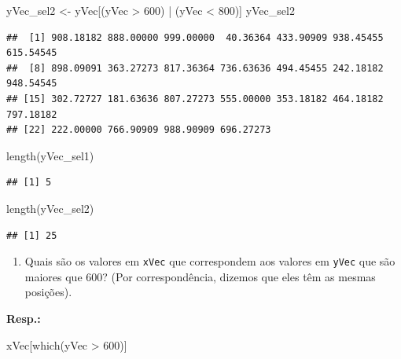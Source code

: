 \documentclass[
]{article}
\newenvironment{Shaded}{\begin{snugshade}}{\end{snugshade}}
\newcommand{\DecValTok}[1]{\textcolor[rgb]{0.00,0.00,0.81}{#1}}
\newcommand{\FunctionTok}[1]{\textcolor[rgb]{0.00,0.00,0.00}{#1}}
\newcommand{\NormalTok}[1]{#1}
\newcommand{\OtherTok}[1]{\textcolor[rgb]{0.56,0.35,0.01}{#1}}
\newcommand{\SpecialCharTok}[1]{\textcolor[rgb]{0.00,0.00,0.00}{#1}}
\providecommand{\tightlist}{%
  \setlength{\itemsep}{0pt}\setlength{\parskip}{0pt}}
\begin{document}
\begin{Shaded}
\begin{Highlighting}[]
\NormalTok{yVec\_sel2 }\OtherTok{\textless{}{-}}\NormalTok{ yVec[(yVec }\SpecialCharTok{\textgreater{}} \DecValTok{600}\NormalTok{) }\SpecialCharTok{|}\NormalTok{ (yVec }\SpecialCharTok{\textless{}} \DecValTok{800}\NormalTok{)]}
\NormalTok{yVec\_sel2}
\end{Highlighting}
\end{Shaded}

\begin{verbatim}
##  [1] 908.18182 888.00000 999.00000  40.36364 433.90909 938.45455 615.54545
##  [8] 898.09091 363.27273 817.36364 736.63636 494.45455 242.18182 948.54545
## [15] 302.72727 181.63636 807.27273 555.00000 353.18182 464.18182 797.18182
## [22] 222.00000 766.90909 988.90909 696.27273
\end{verbatim}

\begin{Shaded}
\begin{Highlighting}[]
\FunctionTok{length}\NormalTok{(yVec\_sel1)}
\end{Highlighting}
\end{Shaded}

\begin{verbatim}
## [1] 5
\end{verbatim}

\begin{Shaded}
\begin{Highlighting}[]
\FunctionTok{length}\NormalTok{(yVec\_sel2)}
\end{Highlighting}
\end{Shaded}

\begin{verbatim}
## [1] 25
\end{verbatim}

\begin{enumerate}
\def\labelenumi{\arabic{enumi}.}
\setcounter{enumi}{5}
\tightlist
\item
  Quais são os valores em \texttt{xVec} que correspondem aos valores em \texttt{yVec} que são maiores que 600? (Por correspondência, dizemos que eles têm as mesmas posições).
\end{enumerate}

\textbf{Resp.:}

\begin{Shaded}
\begin{Highlighting}[]
\NormalTok{xVec[}\FunctionTok{which}\NormalTok{(yVec }\SpecialCharTok{\textgreater{}} \DecValTok{600}\NormalTok{)]}
\end{Highlighting}
\end{Shaded}
\end{document}

